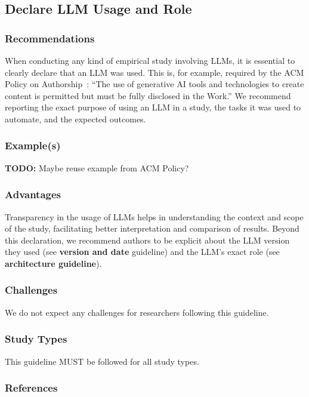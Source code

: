 \documentclass[11pt]{article}
\begin{document}
\subsection{Declare LLM Usage and Role}

\subsubsection{Recommendations}

When conducting any kind of empirical study involving LLMs, it is essential to clearly declare that an LLM was used.
This is, for example, required by the ACM Policy on Authorship~\cite{ACM2023}: ``The use of generative AI tools and technologies to create content is permitted but must be fully disclosed in the Work.''
We recommend reporting the exact purpose of using an LLM in a study, the tasks it was used to automate, and the expected outcomes.

\subsubsection{Example(s)}

\textbf{TODO: } Maybe reuse example from ACM Policy?

\subsubsection{Advantages}

Transparency in the usage of LLMs helps in understanding the context and scope of the study, facilitating better interpretation and comparison of results.
Beyond this declaration, we recommend authors to be explicit about the LLM version they used (see \textbf{version and date} guideline) and the LLM's exact role (see \textbf{architecture guideline}).

\subsubsection{Challenges}

We do not expect any challenges for researchers following this guideline.

\subsubsection{Study Types}

This guideline MUST be followed for all study types.

\subsubsection{References}



\end{document}
